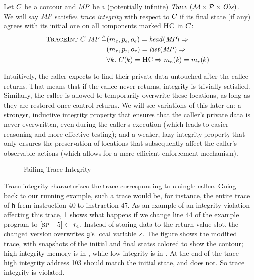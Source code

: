 \documentclass[acmsmall,review,anonymous]{acmart}\settopmatter{printfolios=true,printccs=false,printacmref=false}
\begin{document}

Let \(C\) be a contour and \(\mathit{MP}\) be a (potentially infinite)
\(\mathit{Trace}~({\mathcal M} \times \mathcal{P} \times \mathit{Obs})\). We will say \(\mathit{MP}\) satisfies {\em trace integrity} with
respect to \(C\) if its final state (if any) agrees with its
initial one on all components marked \(\textsc{HC}\) in \(C\):
%
\[\begin{split}
  \text{\sc TraceInt} ~ C ~ \mathit{MP} \triangleq &
    (m_e,p_e,o_e) = \mathit{head}(\mathit{MP}) \Rightarrow \\
  & (m_r,p_r,o_r) = \mathit{last}(\mathit{MP}) \Rightarrow \\
  & \forall k. ~ C(k) = \textsc{HC} \Rightarrow
    m_e(k) = m_r(k) \\
\end{split}\]

Intuitively, the caller expects to find their private data untouched
after the callee returns. That means that if the callee never returns,
integrity is trivially satisfied. Similarly, the callee is allowed to
temporarily overwrite these locations, as long as they are restored
once control returns. We will see variations of this later on: a
stronger, inductive integrity property that ensures that the caller's
private data is never overwritten, even during the caller's execution
(which leads to easier reasoning and more effective testing);
and a weaker, lazy integrity property that only ensures the preservation
of locations that subsequently affect the caller's observable actions
(which allows for a more efficient enforcement mechanism).

\begin{figure}
  \integrityexample
  \caption{Failing Trace Integrity}
  \label{fig:intex}
\end{figure}

Trace integrity characterizes the trace corresponding to a single
callee.
Going back to our running example, such a trace would be, for
instance, the entire trace of {\tt h} from instruction 40 to
instruction 47.
As an example of an integrity violation affecting this trace, \cref{fig:intex} shows what happens
if we change line 44 of the example program to $[\textsc{sp} - 5] \leftarrow r_4$.
Instead of storing data to the return value slot,
the changed version overwrites {\tt g}'s local variable {\tt z}.
The figure shows the modified trace, with snapshots of the initial
and final states colored to show the contour; high
integrity memory is in \high, while low integrity is in \low.
At the end of the trace high integrity address 103 should match the initial
state, and does not. So trace integrity is violated.
\end{document}
